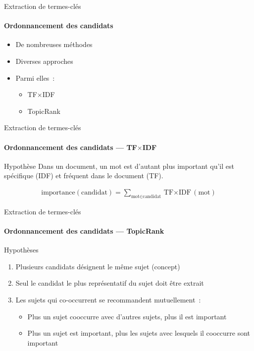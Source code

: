   \begin{frame}{Extraction de termes-clés}
    \framesubtitle{Ordonnancement des candidats}

    \begin{itemize}
      \item{De nombreuses méthodes}
      \item{Diverses approches}
      \item{Parmi elles~:}
      \begin{itemize}
        \item{TF$\times$IDF}
        \item{TopicRank~\cite{bougouin2013topicrank}}
      \end{itemize}
    \end{itemize}
  \end{frame}

  \begin{frame}{Extraction de termes-clés}
    \framesubtitle{Ordonnancement des candidats --- TF$\times$IDF}

    \begin{block}{Hypothèse}
      Dans un document, un mot est d'autant plus important qu'il est spécifique
      (IDF) et fréquent dans le document (TF).
    \end{block}

    \begin{align*}
      \text{importance}(\text{candidat}) = \sum_{\text{mot} \in \text{candidat}} \text{TF$\times$IDF}(\text{mot})
    \end{align*}
  \end{frame}

  \begin{frame}{Extraction de termes-clés}
    \framesubtitle{Ordonnancement des candidats --- TopicRank}

    \begin{block}{Hypothèses}
      \begin{enumerate}
        \item{Plusieurs candidats désignent le même sujet (concept)}
        \item{Seul le candidat le plus représentatif du sujet doit être extrait}
        \item{Les sujets qui co-occurrent se recommandent mutuellement~:}
        \begin{itemize}
          \item{Plus un sujet cooccurre avec d'autres sujets, plus il est
                important}
          \item{Plus un sujet est important, plus les sujets avec lesquels il
                cooccurre sont important}
        \end{itemize}
      \end{enumerate}
    \end{block}
  \end{frame}

